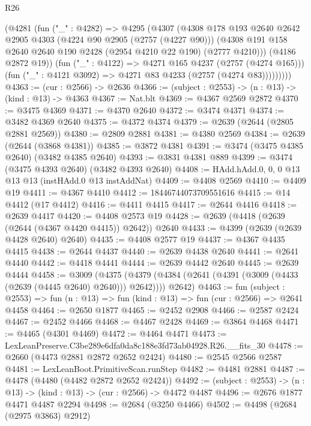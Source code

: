 \begin{lexlean}{R26}
\begin{coremodule}
            (@4281
              (fun ("_" : @4282) =>
              @4295
                (@4307
                  (@4308
                    @178
                    @193
                    @2640
                    @2642
                    @2905
                    @4303
                    (@4224 @90 @2905 (@2757 (@4227 @90)))
                    (@4308 @191 @158 @2640 @2640 @190 @2428 (@2954 @4210 @22 @190) (@2777 @4210)))
                  (@4186 @2872 @19))
                (fun ("_" : @4122) => @4271 @165 @4237 (@2757 (@4274 @165)))
                (fun ("_" : @4121 @3092) => @4271 @83 @4233 (@2757 (@4274 @83)))))))))
@4363 := (cur : @2566) -> @2636
@4366 := (subject : @2553) -> (n : @13) -> (kind : @13) -> @4363
@4367 := Nat.blt
@4369 := @4367 @2569 @2872
@4370 := @3475 @4369
@4371 := @4370 @2640
@4372 := @3474 @4371
@4374 := @3482 @4369 @2640
@4375 := @4372 @4374
@4379 := @2639 (@2644 (@2805 @2881 @2569))
@4380 := @2809 @2881
@4381 := @4380 @2569
@4384 := @2639 (@2644 (@3868 @4381))
@4385 := @3872 @4381
@4391 := @3474 (@3475 @4385 @2640) (@3482 @4385 @2640)
@4393 := @3831 @4381 @889
@4399 := @3474 (@3475 @4393 @2640) (@3482 @4393 @2640)
@4408 := HAdd.hAdd.{0, 0, 0} @13 @13 @13 (instHAdd.{0} @13 instAddNat)
@4409 := @4408 @2569
@4410 := @4409 @19
@4411 := @4367 @4410
@4412 := 18446744073709551616
@4415 := @14 @4412 (@17 @4412)
@4416 := @4411 @4415
@4417 := @2644 @4416
@4418 := @2639 @4417
@4420 := @4408 @2573 @19
@4428 := @2639 (@4418 (@2639 (@2644 (@4367 @4420 @4415)) @2642)) @2640
@4433 := @4399 (@2639 (@2639 @4428 @2640) @2640)
@4435 := @4408 @2577 @19
@4437 := @4367 @4435 @4415
@4438 := @2644 @4437
@4440 := @2639 @4438 @2640
@4441 := @2641 @4440
@4442 := @4418 @4441
@4444 := @2639 @4442 @2640
@4445 := @2639 @4444
@4458 := @3009
    (@4375 (@4379 (@4384 (@2641 (@4391 (@3009 (@4433 (@2639 (@4445 @2640) @2640))) @2642)))) @2642)
@4463 := fun (subject : @2553) =>
  fun (n : @13) => fun (kind : @13) => fun (cur : @2566) => @2641 @4458
@4464 := @2650 @1877
@4465 := @2452 @2908
@4466 := @2587 @2424
@4467 := @2452 @4466
@4468 := @4467 @2428
@4469 := @3864 @4468
@4471 := @4465 (@4301 @4469)
@4472 := @4464 @4471
@4473 := LexLeanPreserve.C3be289e6dfa0da8c188e3fd73ab04928.R26.__fits_30
@4478 := @2660 (@4473 @2881 @2872 @2652 @2424)
@4480 := @2545 @2566 @2587
@4481 := LexLeanBoot.PrimitiveScan.runStep
@4482 := @4481 @2881
@4487 := @4478 (@4480 (@4482 @2872 @2652 @2424))
@4492 := (subject : @2553) -> (n : @13) -> (kind : @13) -> (cur : @2566) -> @4472 @4487
@4496 := @2676 @1877 @4471 @4487 @2294
@4498 := @2684 (@3250 @4466)
@4502 := @4498 (@2684 (@2975 @3863) @2912)

\end{coremodule}
\end{lexlean}
